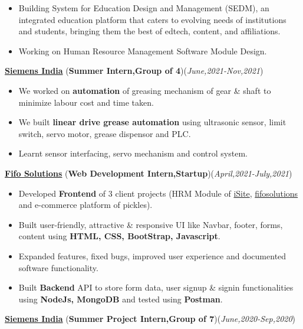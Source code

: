 \documentclass[10pt]{extarticle}
\begin{document}
    \begin{itemize}
       \item Building System for Education Design and Management (SEDM), an integrated education platform that caters to evolving needs of institutions and students, bringing them the best of edtech, content, and affiliations. 
       \item Working on Human Resource Management Software Module Design.
    \end{itemize}
\vspace{3pt}
\href{https://github.com/PSoni8/Siemens-2021-2022-Internship}{\textbf{Siemens India}} (\textbf{Summer Intern,Group of 4})\hfill\hfill(\textit{June,2021-Nov,2021})
     \begin{itemize}
         \item We worked on \textbf{automation} of greasing mechanism of gear \& shaft to minimize labour cost and time taken.
         \item We built \textbf{linear drive grease automation} using ultrasonic sensor, limit switch, servo motor, grease dispensor and PLC. 
         \item Learnt sensor interfacing, servo mechanism and control system.
     \end{itemize}
\vspace{3pt}
\href{https://github.com/PSoni8/FIFO-Solutions-Internship}{\textbf{Fifo Solutions}} (\textbf{Web Development Intern,Startup})\hfill\hfill(\textit{April,2021-July,2021})
    \begin{itemize}
        \item Developed \textbf{Frontend} of 3 client projects (HRM Module of \href{https://isiteinfo.com/}{iSite}, \href{https://www.fifosolutions.com/}{fifosolutions} and e-commerce platform of pickles).
        \item Built user-friendly, attractive \& responsive UI like Navbar, footer, forms, content using \textbf{HTML, CSS, BootStrap, Javascript}.
        \item Expanded features, fixed bugs, improved user experience and documented software functionality.
        \item Built \textbf{Backend} API to store form data, user signup \& signin functionalities using \textbf{NodeJs, MongoDB} and tested using \textbf{Postman}.
    \end{itemize}
\vspace{3pt}
\href{https://github.com/PSoni8/Automation-in-Hospital-Systems}{\textbf{Siemens India}} (\textbf{Summer Project Intern,Group of 7})\hfill\hfill(\textit{June,2020-Sep,2020})
\end{document}
